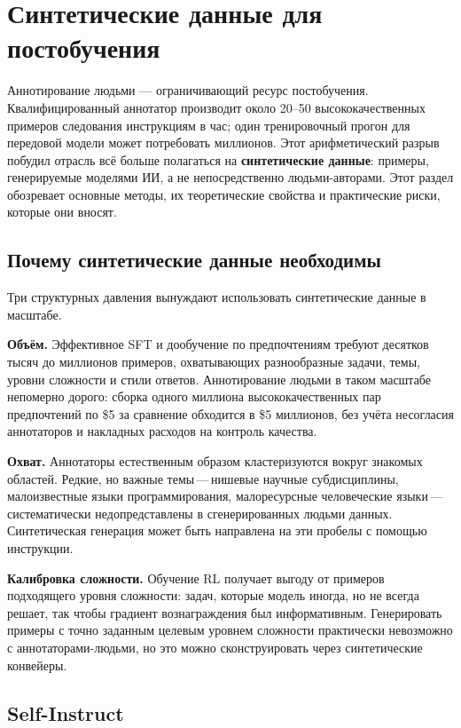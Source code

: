 \section{Синтетические данные для постобучения}
\label{sec:synthetic-data}

Аннотирование людьми --- ограничивающий ресурс постобучения. Квалифицированный аннотатор производит около 20--50 высококачественных примеров следования инструкциям в час; один тренировочный прогон для передовой модели может потребовать миллионов. Этот арифметический разрыв побудил отрасль всё больше полагаться на \textbf{синтетические данные}: примеры, генерируемые моделями ИИ, а не непосредственно людьми-авторами. Этот раздел обозревает основные методы, их теоретические свойства и практические риски, которые они вносят.

\subsection{Почему синтетические данные необходимы}

Три структурных давления вынуждают использовать синтетические данные в масштабе.

\textbf{Объём.} Эффективное SFT и дообучение по предпочтениям требуют десятков тысяч до миллионов примеров, охватывающих разнообразные задачи, темы, уровни сложности и стили ответов. Аннотирование людьми в таком масштабе непомерно дорого: сборка одного миллиона высококачественных пар предпочтений по \$5 за сравнение обходится в \$5 миллионов, без учёта несогласия аннотаторов и накладных расходов на контроль качества.

\textbf{Охват.} Аннотаторы естественным образом кластеризуются вокруг знакомых областей. Редкие, но важные темы\,---\,нишевые научные субдисциплины, малоизвестные языки программирования, малоресурсные человеческие языки\,---\,систематически недопредставлены в сгенерированных людьми данных. Синтетическая генерация может быть направлена на эти пробелы с помощью инструкции.

\textbf{Калибровка сложности.} Обучение RL получает выгоду от примеров подходящего уровня сложности: задач, которые модель иногда, но не всегда решает, так чтобы градиент вознаграждения был информативным. Генерировать примеры с точно заданным целевым уровнем сложности практически невозможно с аннотаторами-людьми, но это можно сконструировать через синтетические конвейеры.

\subsection{Self-Instruct}

